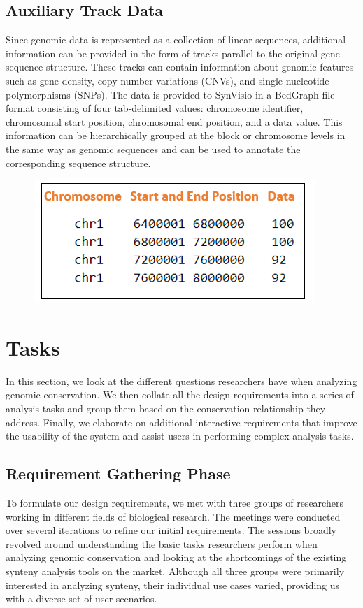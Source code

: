 \subsection{Auxiliary Track Data}
Since genomic data is represented as a collection of linear sequences, additional information can be provided in the form of tracks parallel to the original gene sequence structure. These tracks can contain information about genomic features such as gene density, copy number variations (CNVs), and single-nucleotide polymorphisms (SNPs). The data is provided to SynVisio in a BedGraph file format consisting of four tab-delimited values: chromosome identifier, chromosomal start position, chromosomal end position, and a data value. This information can be hierarchically grouped at the block or chromosome levels in the same way as genomic sequences and can be used to annotate the corresponding sequence structure. 

\begin{figure}
  \centering
  \includegraphics[width=.45\linewidth]{images/ch_3_track_file.PNG}
  \label{fig:ch_3_track_file}
\end{figure}

\section{Tasks}

In this section, we look at the different questions researchers have when analyzing genomic conservation. We then collate all the design requirements into a series of analysis tasks and group them based on the conservation relationship they address. Finally, we elaborate on additional interactive requirements that improve the usability of the system and assist users in performing complex analysis tasks.

\subsection{Requirement Gathering Phase}
To formulate our design requirements, we met with three groups of researchers working in different fields of biological research. The meetings were conducted over several iterations to refine our initial requirements. The sessions broadly revolved around understanding the basic tasks researchers perform when analyzing genomic conservation and looking at the shortcomings of the existing synteny analysis tools on the market. Although all three groups were primarily interested in analyzing synteny, their individual use cases varied, providing us with a diverse set of user scenarios.

